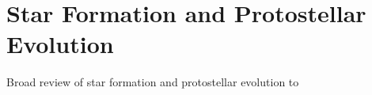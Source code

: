 \section{Star Formation and Protostellar Evolution}
Broad review of star formation and protostellar evolution to 